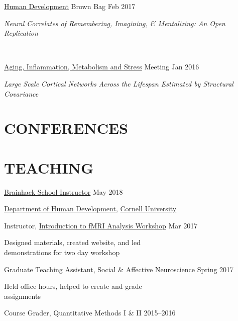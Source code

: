 \documentclass{friggeri-bib}
\begin{document}
\href{http://www.human.cornell.edu/hd/}{Human Development} Brown Bag \hfill Feb 2017 \\[0.15cm]
\begin{minipage}{10cm}
\textit{Neural Correlates of Remembering, Imagining, \& Mentalizing: An Open Replication}
\end{minipage} \\
\vspace{10pt}

\href{https://www.libert.cornell.edu/index.php/amm2}{Aging, Inflammation, Metabolism and Stress} Meeting \hfill Jan 2016 \\[0.15cm]
\begin{minipage}{10cm}
\textit{Large Scale Cortical Networks Across the Lifespan      Estimated by Structural Covariance}
\end{minipage}
\vspace{15pt}

\section{CONFERENCES}


\section{TEACHING}

\href{https://brainhackmtl.github.io/school2018/}{Brainhack School Instructor} \hfill May 2018
\vspace{12pt}

\href{http://www.human.cornell.edu/hd/}{Department of Human Development}, \href{https://www.cornell.edu/}{Cornell University}
\begin{outerlist}
 \item[Instructor, \href{https://emdupre.github.io/hd4630_workshops/categories}{Introduction to fMRI Analysis Workshop}] \hfill Mar 2017
  \begin{innerlist}
  \item Designed materials, created website, and led \\  demonstrations for two day workshop
 \end{innerlist}
 
 \item[Graduate Teaching Assistant, Social \& Affective Neuroscience] \hfill Spring 2017
 \begin{innerlist}
  \item Held office hours, helped to create and grade \\ assignments
 \end{innerlist}
 
 \item[Course Grader, Quantitative Methods I \& II] \hfill 2015--2016
\end{outerlist}
\end{document}
